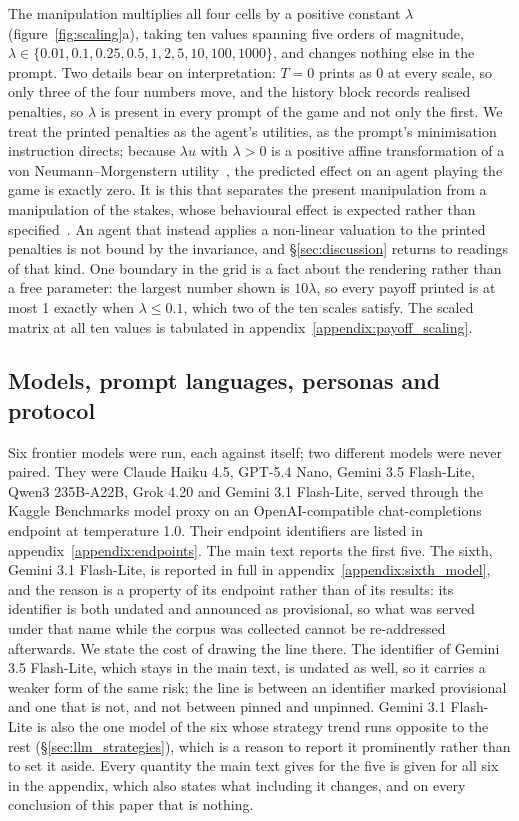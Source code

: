 \documentclass[openacc]{rsproca_new}
\newcommand{\lam}{\lambda}
\begin{document}
The manipulation multiplies all four cells by a positive constant $\lam$
(figure~\ref{fig:scaling}a), taking ten values spanning five orders of
magnitude, $\lam \in \{0.01, 0.1, 0.25, 0.5, 1, 2, 5, 10, 100, 1000\}$, and
changes nothing else in the prompt. Two details bear on interpretation:
$T = 0$ prints as 0 at every scale, so only three of the four numbers move, and
the history block records realised penalties, so $\lam$ is present in every
prompt of the game and not only the first. We treat the printed penalties as
the agent's utilities, as the prompt's minimisation instruction directs;
because $\lam u$ with $\lam > 0$ is a positive affine transformation of a
von Neumann--Morgenstern utility~\cite{von2007theory,luce1957games}, the
predicted effect on an agent playing the game is exactly zero. It is this that
separates the present manipulation from a manipulation of the stakes, whose
behavioural effect is expected rather than
specified~\cite{han_when_2021,kahneman1979prospect,tversky1981framing}. An
agent that instead applies a non-linear valuation to the printed penalties is
not bound by the invariance, and \S\ref{sec:discussion} returns to readings of
that kind. One boundary in the grid is a fact about the rendering rather than a
free parameter: the largest number shown is $10\lam$, so every payoff printed
is at most 1 exactly when $\lam \leq 0.1$, which two of the ten scales satisfy.
The scaled matrix at all ten values is tabulated in
appendix~\ref{appendix:payoff_scaling}.

\subsection{Models, prompt languages, personas and protocol}\label{sec:protocol}

Six frontier models were run, each against itself; two different models were
never paired. They were Claude Haiku 4.5, GPT-5.4 Nano, Gemini 3.5 Flash-Lite,
Qwen3 235B-A22B, Grok 4.20 and Gemini 3.1 Flash-Lite, served through the Kaggle
Benchmarks model proxy on an OpenAI-compatible chat-completions endpoint at
temperature 1.0. Their endpoint identifiers are listed in
appendix~\ref{appendix:endpoints}. The main text reports the first five. The
sixth, Gemini 3.1 Flash-Lite, is reported in full in
appendix~\ref{appendix:sixth_model}, and the reason is a property of its
endpoint rather than of its results: its identifier is both undated and
announced as provisional, so what was served under that name while the corpus
was collected cannot be re-addressed afterwards. We state the cost of drawing
the line there. The identifier of Gemini 3.5 Flash-Lite, which stays in the
main text, is undated as well, so it carries a weaker form of the same risk;
the line is between an identifier marked provisional and one that is not, and
not between pinned and unpinned. Gemini 3.1 Flash-Lite is also the one model of
the six
whose strategy trend runs opposite to the rest (\S\ref{sec:llm_strategies}),
which is a reason to report it prominently rather than to set it aside. Every
quantity the main text gives for the five is given for all six in the appendix,
which also states what including it changes, and on every conclusion of this
paper that is nothing.
\end{document}
